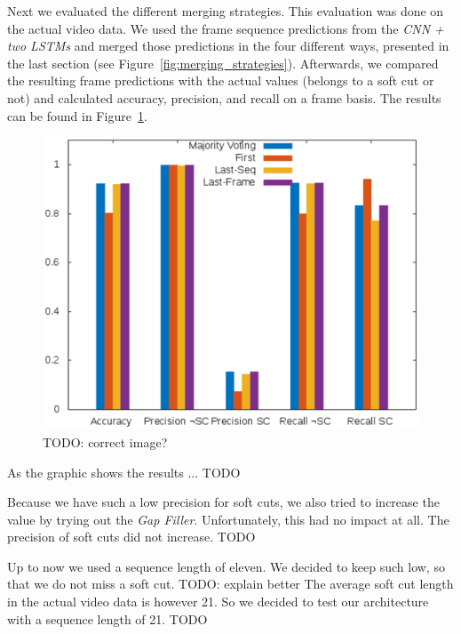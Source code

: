 Next we evaluated the different merging strategies.
This evaluation was done on the actual video data.
We used the frame sequence predictions from the \textit{CNN + two LSTMs} and merged those predictions in the four different ways, presented in the last section (see Figure~\ref{fig:merging_strategies}).
Afterwards, we compared the resulting frame predictions with the actual values (belongs to a soft cut or not) and calculated accuracy, precision, and recall on a frame basis. %
The results can be found in Figure~\ref{fig:evaluation_net}.
\begin{figure}[!htb]
	\centering
	\includegraphics[scale=.7]{images/evalutation_net.eps}
	\caption{TODO: correct image?}
	\label{fig:evaluation_net}
\end{figure}
As the graphic shows the results ... TODO

Because we have such a low precision for soft cuts, we also tried to increase the value by trying out the \textit{Gap Filler}.
Unfortunately, this had no impact at all.
The precision of soft cuts did not increase.
TODO

Up to now we used a sequence length of eleven.
We decided to keep such low, so that we do not miss a soft cut.
TODO: explain better
The average soft cut length in the actual video data is however 21.
So we decided to test our architecture with a sequence length of 21.
TODO


